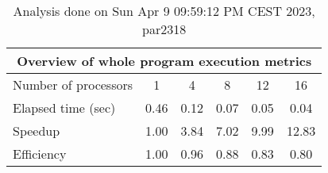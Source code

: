 \begin{table}[h]
\begin{center}
\begin{tabular}{|l|c|c|c|c|c|}
\hline
\multicolumn{6}{|c|}{Overview of whole program execution metrics} \\
\hline
\hline
Number of processors & 1 & 4 & 8 & 12 & 16 \\
\hline
Elapsed time (sec)      &       0.46 &       0.12 &       0.07 &       0.05 &       0.04 \\
\hline
Speedup                 &       1.00 &       3.84 &       7.02 &       9.99 &      12.83 \\
\hline
Efficiency              &       1.00 &       0.96 &       0.88 &       0.83 &       0.80 \\
\hline
\end{tabular}
\end{center}
\caption{ Analysis done on Sun Apr  9 09:59:12 PM CEST 2023, par2318}
\end{table}
